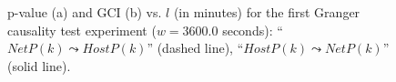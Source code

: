 \begin{figure}[p]
  \centering
  
  
  
  \caption{p-value (a) and \ac{GCI} (b) vs. $l$ (in
    minutes) for the first Granger causality test experiment ($w =
    3600.0$ seconds): ``$NetP(k) \leadsto HostP(k)$'' (dashed line),
    ``$HostP(k) \leadsto NetP(k)$'' (solid line).}
  \label{fig:h_a0}
\end{figure}

